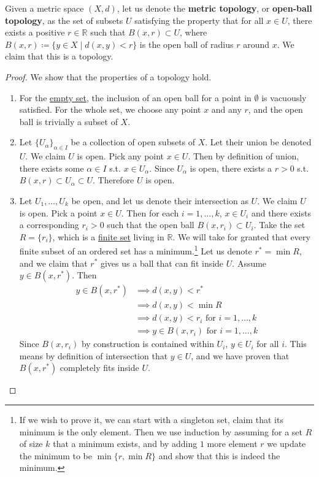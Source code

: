   \begin{definition}
    \label{def:metric-topology}
    Given a metric space $(X, d)$, let us denote the \textbf{metric topology}, or \textbf{open-ball topology}, as the set of subsets $U$ satisfying the property that for all $x \in U$, there exists a positive $r \in \mathbb{R}$ such that $B(x, r) \subset U$, where $B(x, r) \coloneqq \{y \in X \mid d(x, y) < r\}$ is the open ball of radius $r$ around $x$. We claim that this is a topology. 
  \end{definition} 
  \begin{proof}
    We show that the properties of a topology hold. 
    \begin{enumerate} 
      \item For the \hyperref[st-def:empty-set]{empty set}, the inclusion of an open ball for a point in $\emptyset$ is vacuously satisfied. For the whole set, we choose any point $x$ and any $r$, and the open ball is trivially a subset of $X$. 

      \item Let $\{U_\alpha\}_{\alpha \in I}$ be a collection of open subsets of $X$. Let their union be denoted $U$. We claim $U$ is open. Pick any point $x \in U$. Then by definition of union, there exists some $\alpha \in I$ s.t. $x \in U_\alpha$. Since $U_\alpha$ is open, there exists a $r > 0$ s.t. $B(x, r) \subset U_\alpha \subset U$. Therefore $U$ is open. 

      \item Let $U_1, \ldots, U_k$ be open, and let us denote their intersection as $U$. We claim $U$ is open. Pick a point $x \in U$. Then for each $i = 1, \ldots, k$, $x \in U_i$ and there exists a corresponding $r_i > 0$  such that the open ball $B(x, r_i) \subset U_i$. Take the set $R = \{r_i\}$, which is a \hyperref[st-def:finite-set]{finite set} living in $\mathbb{R}$. We will take for granted that every finite subset of an ordered set has a minimum.\footnote{If we wish to prove it, we can start with a singleton set, claim that its minimum is the only element. Then we use induction by assuming for a set $R$ of size $k$ that a minimum exists, and by adding $1$ more element $r$ we update the minimum to be $\min\{r, \min{R}\}$ and show that this is indeed the minimum.} Let us denote $r^\ast = \min{R}$, and we claim that $r^\ast$ gives us a ball that can fit inside $U$. Assume $y \in B(x, r^\ast)$. Then 
      \begin{align}
        y \in B(x, r^\ast) & \implies d(x, y) < r^\ast \\ 
                           & \implies d(x, y) < \min{R} \\
                           & \implies d(x, y) < r_i \text{ for } i = 1, \ldots, k \\
                           & \implies y \in B(x, r_i) \text{ for } i = 1, \ldots, k
      \end{align} 
      Since $B(x, r_i)$ by construction is contained within $U_i$, $y \in U_i$ for all $i$. This means by definition of intersection that $y \in U$, and we have proven that $B(x, r^\ast)$ completely fits inside $U$. 
    \end{enumerate}
  \end{proof} 

